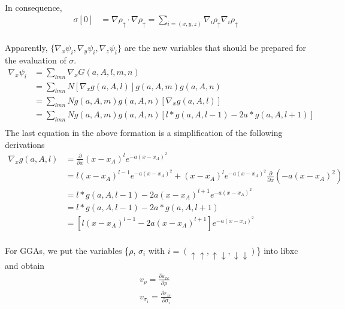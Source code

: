 \documentclass[a4paper,12pt]{article}
\begin{document}
In consequence, 
\begin{equation}
	\begin{split}
		\sigma[0] &= \nabla \rho_{\uparrow} \cdot \nabla \rho_{\uparrow} = \sum_{i=(x,y,z)}\nabla_{i} \rho_{\uparrow}\nabla_{i}\rho_{\uparrow}\\
	\end{split}
\end{equation}

Apparently, $\{\nabla_{x}\psi_i,\nabla_{y}\psi_i,\nabla_{z}\psi_i\} $ are the new variables that should be prepared for the evaluation of $\sigma$.
\begin{equation}
	\begin{split}
	    \nabla_{x}\psi_i &= \sum_{lmn}\nabla_{x}G(a,A,l,m,n)\\
	                     &= \sum_{lmn}N[\nabla_{x}g(a,A,l)]g(a,A,m)g(a,A,n)\\
	                     &= \sum_{lmn}Ng(a,A,m)g(a,A,n)[\nabla_{x}g(a,A,l)]\\
	                     &= \sum_{lmn}Ng(a,A,m)g(a,A,n)[l*g(a,A,l-1)-2a*g(a,A,l+1)]\\
	\end{split}
\end{equation}
The last equation in the above formation is a simplification of the following derivations
\begin{equation}
	\begin{split}
		\nabla_x g(a,A,l) &= \frac{\partial}{\partial x}(x-x_A)^l e^{-a (x-x_A)^2}\\
		&=l(x-x_A)^{l-1} e^{-a (x-x_A)^2} + (x-x_A)^l e^{-a (x-x_A)^2} \frac{\partial}{\partial x}(-a (x-x_A)^2)\\
		&=l*g(a,A,l-1) -2a (x-x_A)^{l+1} e^{-a (x-x_A)^2}\\
		&=l*g(a,A,l-1) -2a*g(a,A,l+1)\\
		&=\left[l(x-x_A)^{l-1}-2a(x-x_A)^{l+1}\right] e^{-a (x-x_A)^2}\\
	\end{split}
\end{equation}

For GGAs, we put the variables \{$\rho$, $\sigma_i$ with $i=(\uparrow\uparrow, \uparrow\downarrow, \downarrow\downarrow)$\} into libxc and obtain 
\begin{equation}
	\begin{split}
	    v_\rho=\frac{\partial \varepsilon_{xc}}{\partial \rho}\\
		v_{\sigma_i}=\frac{\partial \varepsilon_{xc}}{\partial \sigma_i}\\
    \end{split}
\end{equation}
\end{document}

